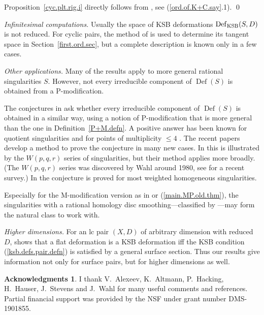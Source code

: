 \documentclass{amsart}
\theoremstyle{definition}
\newtheorem*{ack}{Acknowledgments}      %
\theoremstyle{remark}
\newcommand{\defsp}[0]{\operatorname{Def}}
\begin{document}
Proposition~\ref{cyc.plt.rig.i}  directly follows from \cite[2.23]{k-modbook}, see (\ref{ord.of.K+C.say}.1). \qed

 


\medskip

{\it Infinitesimal computations.}  Usually the space of KSB deformations $\defsp_{\rm KSB}(S, D)$ is not reduced. For cyclic pairs, the method of  \cite{k-alt} is used to  determine its tangent space in Section~\ref{first.ord.sec}, but  a complete description is known only in a  few cases. 



  \medskip

{\it Other applications.}
Many of the results  apply to more general rational singularities  $S$.  However,  not   every irreducible component of $\defsp(S)$
 is obtained from a P-modification.


The conjectures in \cite[Sec.6]{k-etc} ask whether every irreducible component of $\defsp(S)$ is obtained in a similar way, using a  notion of P-modification that is more general than the one in Definition~\ref{P+M.defn}.  A positive answer  has been known for quotient singularities  \cite[3.9]{ksb} and  for  points of multiplicity $\leq 4$ \cite{MR1135880, MR1094706}.  The recent papers \cite{park2022deformations, jeon2023deformations} develop a method to prove the conjecture in many new cases. In \cite{park2022deformations} this is illustrated by the
$W(p,q,r)$ series of singularities, but their method  applies more broadly.  (The $W(p,q,r)$ series was  discovered by Wahl around 1980,  see \cite{MR4270358} for a recent survey.)  In \cite{jeon2023deformations} the conjecture is proved for most weighted homogeneous singularities.


Especially for the M-modification version  as in \cite{be-ch} or (\ref{main.MP.old.thm}), the
singularities with a rational homology disc smoothing---classified by \cite{MR2843099}---may form the natural class to work with.

\medskip

{\it Higher dimensions.} For an lc pair $(X, D)$ of arbitrary dimension with reduced $D$, \cite{k-db3} shows that a flat deformation is a KSB  deformation iff the KSB condition (\ref{ksb.defs.pair.defn})  is satisfied by a  general surface section.
  Thus our results give  information not only for surface pairs, but for higher dimensions as well.



\begin{ack}  I thank   V.~Alexeev, K.~Altmann, P.~Hacking, H.~Hauser,  J.~Stevens and  J.~Wahl  for many   useful comments and references.
Partial  financial support    was provided  by  the NSF under grant number
DMS-1901855.
\end{ack}
\end{document}
